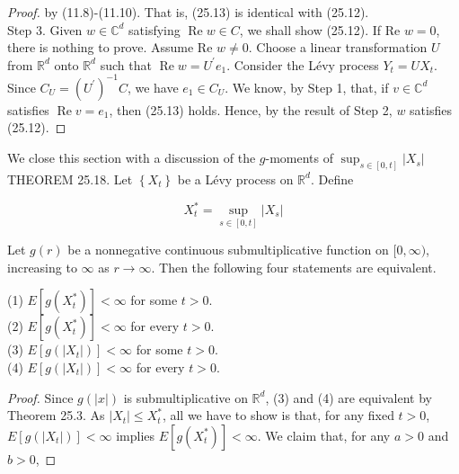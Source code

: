 \documentclass[a4paper,11pt]{article}
\begin{document}
\begin{proof}
    by (11.8)-(11.10). That is, (25.13) is identical with (25.12). \\

    Step 3. Given $w \in \mathbb{C}^{d}$ satisfying $\operatorname{Re} w \in C$, we shall
    show (25.12). If Re $w=0$, there is nothing to prove. Assume Re $w \neq 0$. Choose a
    linear transformation $U$ from $\mathbb{R}^{d}$ onto $\mathbb{R}^{d}$ such that $\operatorname{Re} w=U^{\prime} e_{1}$.
    Consider the Lévy process $Y_{t}=U X_{t}$. Since $C_{U}=\left(U^{\prime}\right)^{-1} C$, we have $e_{1} \in C_{U}$.
    We know, by Step 1, that, if $v \in \mathbb{C}^{d}$ satisfies $\operatorname{Re} v=e_{1}$, then (25.13) holds.
    Hence, by the result of Step 2, $w$ satisfies (25.12).

\end{proof}

We close this section with a discussion of the $g$-moments of $\sup _{s \in[0, t]}\left|X_{s}\right|$ \\

THEOREM 25.18. Let $\left\{X_{t}\right\}$ be a Lévy process on $\mathbb{R}^{d}$. Define

\begin{equation*}
    X_{t}^{*}=\sup _{s \in[0, t]}\left|X_{s}\right| \tag{25.14}
\end{equation*}

Let $g(r)$ be a nonnegative continuous submultiplicative function on $[0, \infty)$, increasing to $\infty$ as $r \rightarrow \infty$.
Then the following four statements are equivalent.

(1) $E\left[g\left(X_{t}^{*}\right)\right]<\infty$ for some $t>0$. \\

(2) $E\left[g\left(X_{t}^{*}\right)\right]<\infty$ for every $t>0$. \\

(3) $E\left[g\left(\left|X_{t}\right|\right)\right]<\infty$ for some $t>0$. \\

(4) $E\left[g\left(\left|X_{t}\right|\right)\right]<\infty$ for every $t>0$. \\

\begin{proof}
    Since $g(|x|)$ is submultiplicative on $\mathbb{R}^{d}$, (3) and (4) are equivalent by
    Theorem 25.3. As $\left|X_{t}\right| \leq X_{t}^{*}$, all we have to show is that, for
    any fixed $t>0$, $E\left[g\left(\left|X_{t}\right|\right)\right]<\infty$ implies
    $E\left[g\left(X_{t}^{*}\right)\right]<\infty$. We claim that, for any $a>0$ and $b>0$,
\end{proof}
\end{document}
